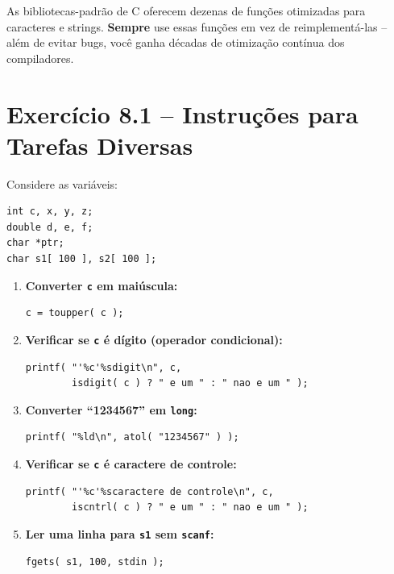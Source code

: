 \documentclass[12pt,a4paper]{article}
\begin{document}
\begin{boaprática}
  As bibliotecas-padrão de C oferecem dezenas de funções otimizadas para
  caracteres e strings. \textbf{Sempre} use essas funções em vez de
  reimplementá-las -- além de evitar bugs, você ganha décadas de otimização
  contínua dos compiladores.
\end{boaprática}

\tableofcontents\newpage

\section{Exercício 8.1 -- Instruções para Tarefas Diversas}

\begin{respostabox}
Considere as variáveis:
\begin{lstlisting}
int c, x, y, z;
double d, e, f;
char *ptr;
char s1[ 100 ], s2[ 100 ];
\end{lstlisting}

\begin{enumerate}[label=\textbf{\alph*)}]

\item \textbf{Converter \texttt{c} em maiúscula:}
\begin{lstlisting}
c = toupper( c );
\end{lstlisting}

\item \textbf{Verificar se \texttt{c} é dígito (operador condicional):}
\begin{lstlisting}
printf( "'%c'%sdigit\n", c,
        isdigit( c ) ? " e um " : " nao e um " );
\end{lstlisting}

\item \textbf{Converter ``1234567'' em \texttt{long}:}
\begin{lstlisting}
printf( "%ld\n", atol( "1234567" ) );
\end{lstlisting}

\item \textbf{Verificar se \texttt{c} é caractere de controle:}
\begin{lstlisting}
printf( "'%c'%scaractere de controle\n", c,
        iscntrl( c ) ? " e um " : " nao e um " );
\end{lstlisting}

\item \textbf{Ler uma linha para \texttt{s1} sem \texttt{scanf}:}
\begin{lstlisting}
fgets( s1, 100, stdin );
\end{lstlisting}


\end{enumerate}
\end{respostabox}
\end{document}
